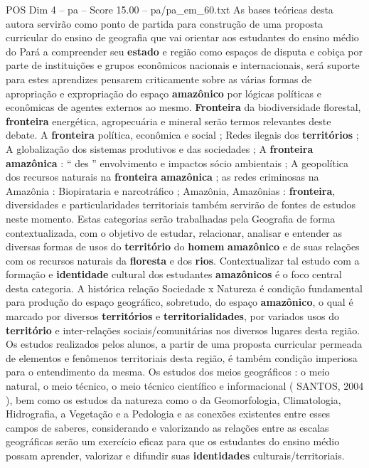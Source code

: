 \begin{textsample}{POS Dim 4 – pa – Score 15.00 – pa/pa\_em\_60.txt}
As bases teóricas desta autora servirão como ponto de partida para construção de uma proposta curricular do ensino de geografia que vai orientar aos estudantes do ensino médio do Pará a compreender seu \textbf{estado} e região como espaços de disputa e cobiça por parte de instituições e grupos econômicos nacionais e internacionais, será suporte para estes aprendizes pensarem criticamente sobre as várias formas de apropriação e expropriação do espaço \textbf{amazônico} por lógicas políticas e econômicas de agentes externos ao mesmo. \textbf{Fronteira} da biodiversidade florestal, \textbf{fronteira} energética, agropecuária e mineral serão termos relevantes deste debate.
A \textbf{fronteira} política, econômica e social ; Redes ilegais dos \textbf{territórios} ; A globalização dos sistemas produtivos e das sociedades ; A \textbf{fronteira} \textbf{amazônica} : “ des ” envolvimento e impactos sócio ambientais ; A geopolítica dos recursos naturais na \textbf{fronteira} \textbf{amazônica} ; as redes criminosas na Amazônia : Biopirataria e narcotráfico ; Amazônia, Amazônias : \textbf{fronteira}, diversidades e particularidades territoriais também servirão de fontes de estudos neste momento.
Estas categorias serão trabalhadas pela Geografia de forma contextualizada, com o objetivo de estudar, relacionar, analisar e entender as diversas formas de usos do \textbf{território} do \textbf{homem} \textbf{amazônico} e de suas relações com os recursos naturais da \textbf{floresta} e dos \textbf{rios}.
Contextualizar tal estudo com a formação e \textbf{identidade} cultural dos estudantes \textbf{amazônicos} é o foco central desta categoria.
A histórica relação Sociedade x Natureza é condição fundamental para produção do espaço geográfico, sobretudo, do espaço \textbf{amazônico}, o qual é marcado por diversos \textbf{territórios} e \textbf{territorialidades}, por variados usos do \textbf{território} e inter-relações sociais/comunitárias nos diversos lugares desta região.
Os estudos realizados pelos alunos, a partir de uma proposta curricular permeada de elementos e fenômenos territoriais desta região, é também condição imperiosa para o entendimento da mesma.
Os estudos dos meios geográficos : o meio natural, o meio técnico, o meio técnico científico e informacional ( SANTOS, 2004 ), bem como os estudos da natureza como o da Geomorfologia, Climatologia, Hidrografia, a Vegetação e a Pedologia e as conexões existentes entre esses campos de saberes, considerando e valorizando as relações entre as escalas geográficas serão um exercício eficaz para que os estudantes do ensino médio possam aprender, valorizar e difundir suas \textbf{identidades} culturais/territoriais.

\end{textsample}
